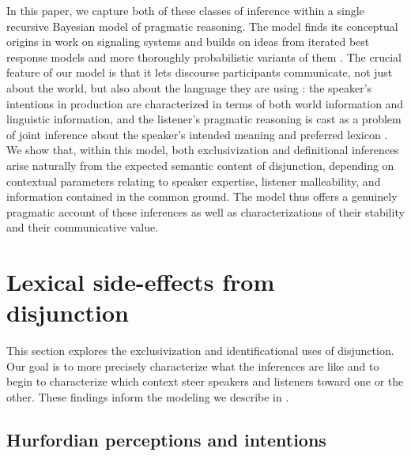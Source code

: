 \documentclass{article}
\begin{document}
In this paper, we capture both of these classes of inference within a
single recursive Bayesian model of pragmatic reasoning. The model
finds its conceptual origins in  work on signaling
systems and builds on ideas from iterated best response models
\citep{Jaeger:2007,Jaeger:2011,Franke09DISS} and more thoroughly
probabilistic variants of them
\citep{CamererHo:2004,Frank:Goodman:2012}. The crucial feature of our
model is that it lets discourse participants communicate, not just
about the world, but also about the language they are using
\citep{Bergen:Goodman:Levy:2012,bergen-levy-goodman:2014}: the
speaker's intentions in production are characterized in terms of both
world information and linguistic information, and the listener's
pragmatic reasoning is cast as a problem of joint inference about the
speaker's intended meaning and preferred lexicon
\citep{Smith:Goodman:Frank:2013}. We show that, within this model,
both exclusivization and definitional inferences arise naturally from
the expected semantic content of disjunction, depending on contextual
parameters relating to speaker expertise, listener malleability, and
information contained in the common ground. The model thus offers a
genuinely pragmatic account of these inferences as well as
characterizations of their stability and their communicative value.


\section{Lexical side-effects from disjunction}\label{sec:data}

This section explores the exclusivization and identificational uses of
disjunction. Our goal is to more precisely characterize what the
inferences are like and to begin to characterize which context steer
speakers and listeners toward one or the other. These findings inform
the modeling we describe in .


\subsection{Hurfordian perceptions and intentions}\label{sec:data:overlapping}
\end{document}

